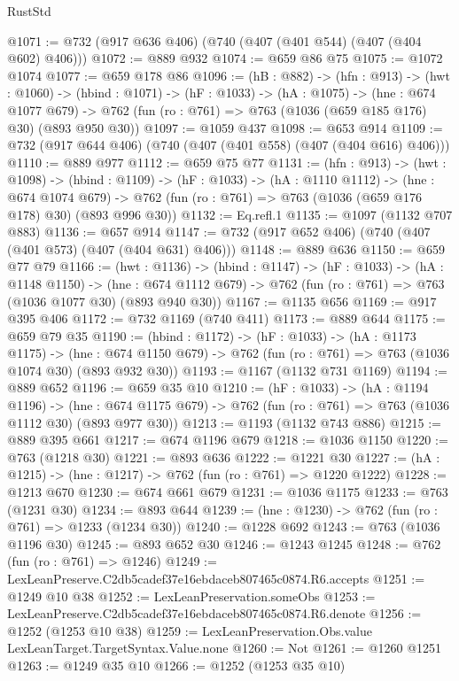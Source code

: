 \begin{lexlean}{RustStd}
\begin{coremodule}
@1071 := @732 (@917 @636 @406) (@740 (@407 (@401 @544) (@407 (@404 @602) @406)))
@1072 := @889 @932
@1074 := @659 @86 @75
@1075 := @1072 @1074
@1077 := @659 @178 @86
@1096 := (hB : @882) ->
  (hfn : @913) ->
  (hwt : @1060) ->
  (hbind : @1071) ->
  (hF : @1033) ->
  (hA : @1075) ->
  (hne : @674 @1077 @679) ->
  @762 (fun (ro : @761) => @763 (@1036 (@659 @185 @176) @30) (@893 @950 @30))
@1097 := @1059 @437
@1098 := @653 @914
@1109 := @732 (@917 @644 @406) (@740 (@407 (@401 @558) (@407 (@404 @616) @406)))
@1110 := @889 @977
@1112 := @659 @75 @77
@1131 := (hfn : @913) ->
  (hwt : @1098) ->
  (hbind : @1109) ->
  (hF : @1033) ->
  (hA : @1110 @1112) ->
  (hne : @674 @1074 @679) ->
  @762 (fun (ro : @761) => @763 (@1036 (@659 @176 @178) @30) (@893 @996 @30))
@1132 := Eq.refl.{1}
@1135 := @1097 (@1132 @707 @883)
@1136 := @657 @914
@1147 := @732 (@917 @652 @406) (@740 (@407 (@401 @573) (@407 (@404 @631) @406)))
@1148 := @889 @636
@1150 := @659 @77 @79
@1166 := (hwt : @1136) ->
  (hbind : @1147) ->
  (hF : @1033) ->
  (hA : @1148 @1150) ->
  (hne : @674 @1112 @679) -> @762 (fun (ro : @761) => @763 (@1036 @1077 @30) (@893 @940 @30))
@1167 := @1135 @656
@1169 := @917 @395 @406
@1172 := @732 @1169 (@740 @411)
@1173 := @889 @644
@1175 := @659 @79 @35
@1190 := (hbind : @1172) ->
  (hF : @1033) ->
  (hA : @1173 @1175) ->
  (hne : @674 @1150 @679) -> @762 (fun (ro : @761) => @763 (@1036 @1074 @30) (@893 @932 @30))
@1193 := @1167 (@1132 @731 @1169)
@1194 := @889 @652
@1196 := @659 @35 @10
@1210 := (hF : @1033) ->
  (hA : @1194 @1196) ->
  (hne : @674 @1175 @679) -> @762 (fun (ro : @761) => @763 (@1036 @1112 @30) (@893 @977 @30))
@1213 := @1193 (@1132 @743 @886)
@1215 := @889 @395 @661
@1217 := @674 @1196 @679
@1218 := @1036 @1150
@1220 := @763 (@1218 @30)
@1221 := @893 @636
@1222 := @1221 @30
@1227 := (hA : @1215) -> (hne : @1217) -> @762 (fun (ro : @761) => @1220 @1222)
@1228 := @1213 @670
@1230 := @674 @661 @679
@1231 := @1036 @1175
@1233 := @763 (@1231 @30)
@1234 := @893 @644
@1239 := (hne : @1230) -> @762 (fun (ro : @761) => @1233 (@1234 @30))
@1240 := @1228 @692
@1243 := @763 (@1036 @1196 @30)
@1245 := @893 @652 @30
@1246 := @1243 @1245
@1248 := @762 (fun (ro : @761) => @1246)
@1249 := LexLeanPreserve.C2db5cadef37e16ebdaceb807465c0874.R6.accepts
@1251 := @1249 @10 @38
@1252 := LexLeanPreservation.someObs
@1253 := LexLeanPreserve.C2db5cadef37e16ebdaceb807465c0874.R6.denote
@1256 := @1252 (@1253 @10 @38)
@1259 := LexLeanPreservation.Obs.value LexLeanTarget.TargetSyntax.Value.none
@1260 := Not
@1261 := @1260 @1251
@1263 := @1249 @35 @10
@1266 := @1252 (@1253 @35 @10)

\end{coremodule}
\end{lexlean}
